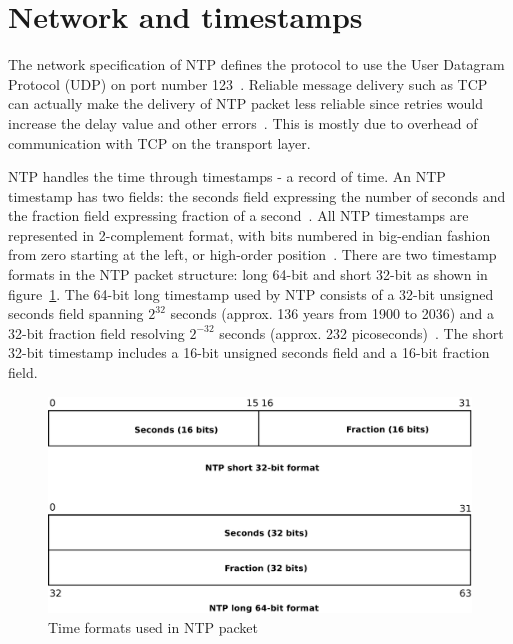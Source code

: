 
\section{Network and timestamps}\label{sec:ntp-network}
The network specification of NTP defines
the protocol to use the User Datagram Protocol (UDP) on port number 123~\cite{ianna-ports,rfc5905}.
Reliable message delivery such as TCP can actually make the delivery of
NTP packet less reliable since retries
would increase the delay value and other errors~\cite{rfc5905}.
This is mostly due to overhead of communication with TCP on the transport layer.

NTP handles the time through timestamps - a record of time.
An NTP timestamp has two fields: the seconds field expressing the number of seconds
and the fraction field expressing fraction of a second~\cite{rfc5905}.
All NTP timestamps are represented in 2-complement format, with
bits numbered in big-endian fashion from zero starting at the left, or high-order position~\cite{rfc5905}.
There are two timestamp formats in the NTP packet structure:
long 64-bit and short 32-bit as shown in figure~\ref{fig:ntp-timestamps}.
The 64-bit long timestamp used by NTP consists of a 32-bit unsigned seconds
field spanning $2^{32}$ seconds (approx. 136 years from 1900 to 2036) and a 32-bit fraction field resolving
$2^{-32}$ seconds (approx. 232 picoseconds)~\cite{rfc5905}.
The short 32-bit timestamp includes a 16-bit unsigned seconds field
and a 16-bit fraction field.

\begin{figure}
	\centering
	\includegraphics[width=13cm,keepaspectratio]{fig/ntp-timestamps.pdf}
	\caption{Time formats used in NTP packet}
	\label{fig:ntp-timestamps}
	\bigskip
\end{figure}

